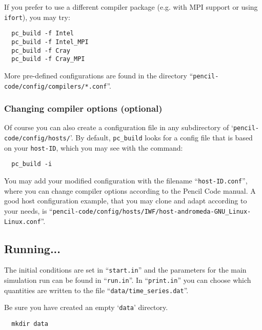 \documentclass[a4paper,12pt]{article}
\newcommand{\command}[1]{\texttt{#1}}
\newcommand{\file}[1]{``\texttt{#1}''}
\newcommand{\directory}[1]{`\texttt{#1}'}
\newcommand{\name}[1]{\textsc{#1}}
\newcommand{\code}[1]{\texttt{#1}}
\begin{document}
If you prefer to use a different compiler package (e.g. with \name{MPI} support or using \command{ifort}), you may try:

\begin{verbatim}
  pc_build -f Intel
  pc_build -f Intel_MPI
  pc_build -f Cray
  pc_build -f Cray_MPI
\end{verbatim}

More pre-defined configurations are found in the directory \file{pencil-code/config/compilers/*.conf}.

\subsubsection{Changing compiler options (optional)}

Of course you can also create a configuration file in any subdirectory of \directory{pencil-code/config/hosts/}.
By default, \command{pc\_build} looks for a config file that is based on your \code{host-ID}, which you may see with the command:
\begin{verbatim}
  pc_build -i
\end{verbatim}
You may add your modified configuration with the filename \file{host-ID.conf}, where you can change compiler options according to the Pencil Code manual.
A good host configuration example, that you may clone and adapt according to your needs, is \file{pencil-code/config/hosts/IWF/host-andromeda-GNU\_Linux-Linux.conf}.

\subsection{Running...}

The initial conditions are set in \file{start.in} and the parameters for the main simulation run can be found in \file{run.in}.
In \file{print.in} you can choose which quantities are written to the file \file{data/time\_series.dat}.

Be sure you have created an empty \directory{data} directory.
\begin{verbatim}
  mkdir data
\end{verbatim}
\end{document}
